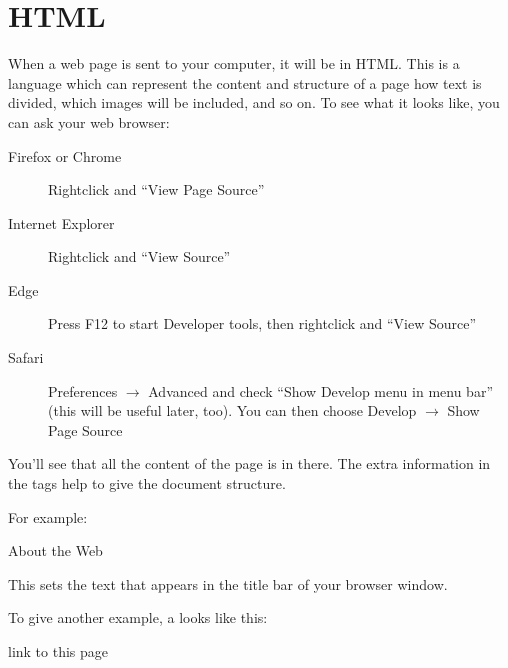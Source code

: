\documentclass[letterpaper,10pt,english]{sphinxmanual}
\begin{document}
\section{HTML}
\label{\detokenize{web:html}}
When a web page is sent to your computer, it will be in HTML. This is a language
which can represent the content and structure of a page \textendash{} how text is divided,
which images will be included, and so on. To see what it looks like, you can ask
your web browser:
\begin{description}
\item[{Firefox or Chrome}] \leavevmode
Right\sphinxhyphen{}click and “View Page Source”

\item[{Internet Explorer}] \leavevmode
Right\sphinxhyphen{}click and “View Source”

\item[{Edge}] \leavevmode
Press F12 to start Developer tools, then right\sphinxhyphen{}click and “View Source”

\item[{Safari}] \leavevmode
Preferences \(\rightarrow\) Advanced and check “Show Develop menu in menu bar”
(this will be useful later, too).
You can then choose Develop \(\rightarrow\) Show Page Source

\end{description}

You’ll see that all the content of the page is in there. The extra information
in the tags help to give the document structure.

For example:

\begin{sphinxVerbatim}[commandchars=\\\{\}]
About the Web
\end{sphinxVerbatim}

This sets the text that appears in the title bar of your browser window.

To give another example, a
looks like this:

\begin{sphinxVerbatim}[commandchars=\\\{\}]
  link to this page
\end{sphinxVerbatim}
\end{document}
